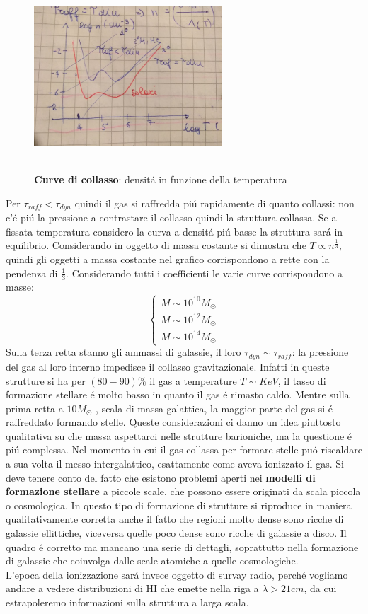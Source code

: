 \documentclass[12pt, a4paper]{article}
\begin{document}
\begin{figure}[htp]
\centering
\includegraphics[width=7cm, height=7cm]{images/nvst.jpeg}
\caption{\textbf{Curve di collasso}: densit\'{a} in funzione della temperatura}
\label{fig:nvst}
\end{figure}
Per $\tau_{raff}<\tau_{dyn}$ quindi il gas si raffredda pi\'{u} rapidamente di quanto collassi: non c'\'{e} pi\'{u} la pressione a contrastare il collasso quindi la struttura collassa. Se a fissata temperatura considero la curva a densit\'{a} pi\'{u} basse la struttura sar\'{a} in equilibrio. Considerando in oggetto di massa costante si dimostra che $T\propto n^{\frac{1}{3}}$, quindi gli oggetti a massa costante nel grafico corrispondono a rette con la pendenza di $\frac{1}{3}$. Considerando tutti i coefficienti le varie curve corrispondono a masse:
\begin{equation}
\begin{cases}
M\sim 10^{10} M_\odot
\\
M\sim 10^{12} M_\odot
\\
M\sim 10^{14} M_\odot
\end{cases}
\end{equation}
Sulla terza retta stanno gli ammassi di galassie, il loro $\tau_{dyn} \sim \tau_{raff}$: la pressione del gas al loro interno impedisce il collasso gravitazionale. Infatti in queste strutture si ha per $(80-90)\%$ il gas a temperature $T\sim KeV$, il tasso di formazione stellare \'{e} molto basso in quanto il gas \'{e} rimasto caldo. Mentre sulla prima retta a $10 M_\odot$ , scala di massa galattica, la maggior parte del gas si \'{e} raffreddato formando stelle. Queste considerazioni ci danno un idea piuttosto qualitativa su che massa aspettarci nelle strutture barioniche, ma la questione \'{e} pi\'{u} complessa. Nel momento in cui il gas collassa per formare stelle pu\'{o} riscaldare a sua volta il messo intergalattico, esattamente come aveva ionizzato il gas. Si deve tenere conto del fatto che esistono problemi aperti nei \textbf{modelli di formazione stellare} a piccole scale, che possono essere originati da scala piccola o cosmologica. In questo tipo di formazione di strutture si riproduce in maniera qualitativamente corretta anche il fatto che regioni molto dense sono ricche di galassie ellittiche, viceversa quelle poco dense sono ricche di galassie a disco. Il quadro \'{e} corretto ma mancano una serie di dettagli, soprattutto nella formazione di galassie che coinvolga dalle scale atomiche a quelle cosmologiche. \\
L'epoca della ionizzazione sar\'{a} invece oggetto di survay radio, perch\'{e} vogliamo andare a vedere distribuzioni di  HI che emette nella riga a $\lambda > 21 cm$, da cui estrapoleremo informazioni sulla struttura a larga scala.
\end{document}
